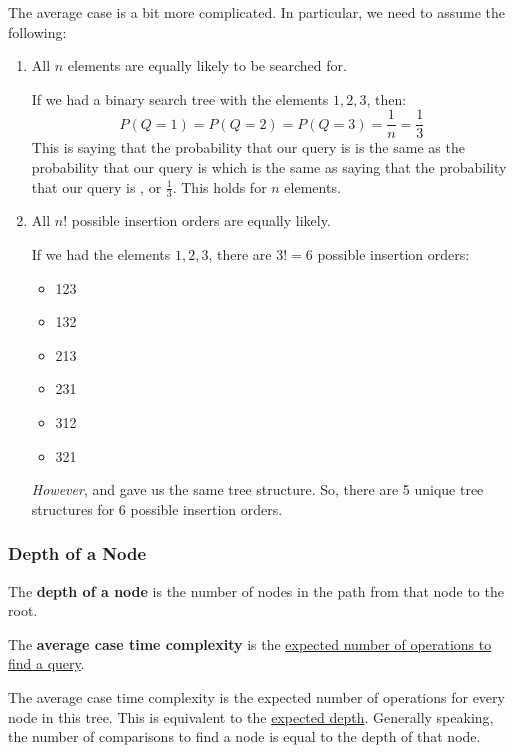 \documentclass[letterpaper]{article}
\begin{document}
The average case is a bit more complicated. In particular, we need to assume the following:
\begin{enumerate}
    \item All $n$ elements are equally likely to be searched for. 
    
    \bigskip 

    If we had a binary search tree with the elements $1, 2, 3$, then: 
    \[P(Q = 1) = P(Q = 2) = P(Q = 3) = \frac{1}{n} = \frac{1}{3}\]
    This is saying that the probability that our query is  is the same as the probability that our query is  which is the same as saying that the probability that our query is , or $\frac{1}{3}$. This holds for $n$ elements. 

    \item All $n!$ possible insertion orders are equally likely. 
    
    \bigskip 

    If we had the elements $1, 2, 3$, there are $3! = 6$ possible insertion orders: 
    \begin{itemize}
        \item 123 
        \item 132 
        \item 213
        \item 231
        \item 312
        \item 321 
    \end{itemize}
    \emph{However},  and  gave us the same tree structure. So, there are 5 unique tree structures for 6 possible insertion orders. 
\end{enumerate}

\subsubsection{Depth of a Node}
The \textbf{depth of a node} is the number of nodes in the path from that node to the root. 

\bigskip 

The \textbf{average case time complexity} is the \underline{expected number of operations to find a query}. 

\bigskip 

The average case time complexity is the expected number of operations for every node in this tree. This is equivalent to the \underline{expected depth}. Generally speaking, the number of comparisons to find a node is equal to the depth of that node. 
\end{document}
